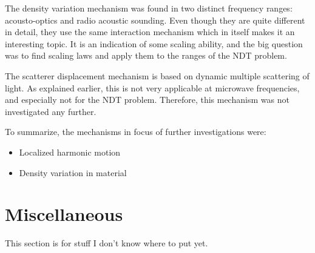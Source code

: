\documentclass[10pt,a4paper,twocolumn,draft]{scrartcl}
\begin{document}
	The density variation mechanism was found in two distinct frequency ranges: acousto-optics and radio acoustic sounding. Even though they are quite different in detail, they use the same interaction mechanism which in itself makes it an interesting topic. It is an indication of some scaling ability, and the big question was to find scaling laws and apply them to the ranges of the NDT problem.
	
	The scatterer displacement mechanism is based on dynamic multiple scattering of light. As explained earlier, this is not very applicable at microwave frequencies, and especially not for the NDT problem. Therefore, this mechanism was not investigated any further.
	
	To summarize, the mechanisms in focus of further investigations were:
	\begin{itemize}
		\item Localized harmonic motion
		\item Density variation in material
	\end{itemize}
	
	\section{Miscellaneous}
	This section is for stuff I don't know where to put yet.
	
\end{document}
